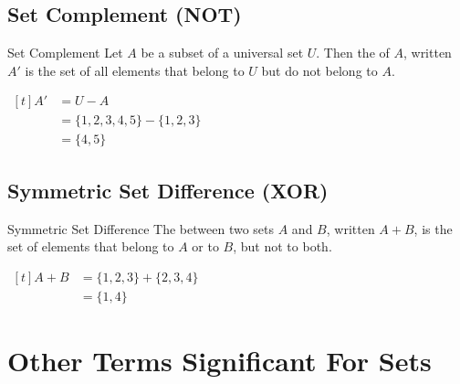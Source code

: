 \documentclass[../notes.tex]{subfiles}
\begin{document}
			\subsection[Set Complement]{Set Complement (NOT)}
				\begin{definition}{Set Complement}
					Let $A$ be a subset of a universal set $U$. Then the  of $A$, written $A'$ is the set of all elements that belong to $U$ but do not belong to $A$.
				\end{definition}
				\nopagebreak
				\begin{center}
					\begin{venntwo}[][$A' = \bigl\{x \mid x \notin A\bigr\}$]
						\fillNotA
					\end{venntwo}
				\end{center}
				\begin{example}[hbox] $
					\begin{aligned}[t]
						A' &= U - A\\
						&= \{1, 2, 3, 4, 5\} - \{1, 2, 3\}\\
						&= \{4, 5\}
					\end{aligned} $
				\end{example}

			\pagebreak
			\subsection[Symmetric Set Difference]{Symmetric Set Difference (XOR)}
				\begin{definition}{Symmetric Set Difference}
					The  between two sets $A$ and $B$, written $A + B$, is the set of elements that belong to $A$ or to $B$, but not to both.
				\end{definition}
				\nopagebreak
				\begin{center}
					\begin{venntwo}[][$A + B = \bigl\{x \mid x \in A$ or $x \in B$, but not both$\bigr\}$]
						\fillOnlyA
						\fillOnlyB
					\end{venntwo}
				\end{center}
				
				\begin{example}[hbox] $
					\begin{aligned}[t]
						A + B &= \{1, 2, 3\} + \{2, 3, 4\}\\
						&= \{1, 4\}
					\end{aligned} $
				\end{example}
		\section{Other Terms Significant For Sets}
\end{document}
